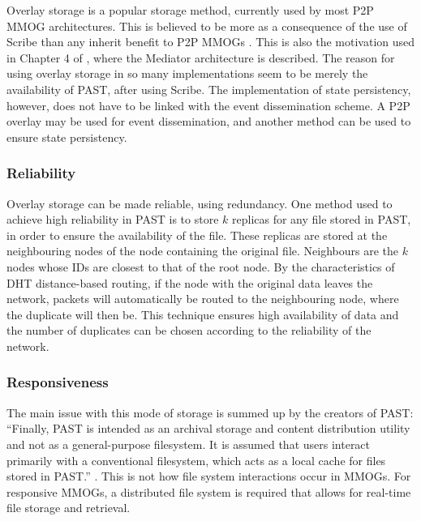 \documentclass[10pt,a4paper,journal,cspaper,compsoc]{IEEEtran}
\begin{document}

Overlay storage is a popular storage method, currently used by most P2P MMOG architectures. This is believed to be more as a consequence of the use
of Scribe than any inherit benefit to P2P MMOGs \cite{past_storage_focus}. This is also the motivation used in Chapter 4 of \cite{Fan_phd}, where the
Mediator architecture is described. The reason for using overlay storage in so many implementations seem to be merely the availability of PAST, after
using Scribe. The implementation of state persistency, however, does not have to be linked with the event dissemination scheme. A P2P overlay may be
used for event dissemination, and another method can be used to ensure state persistency.

\subsubsection{Reliability}
\label{overlay_storage_reliability}

Overlay storage can be made reliable, using redundancy. One method used to achieve high reliability in PAST is to store $k$ replicas for any file
stored in PAST, in order to ensure the availability of the file. These replicas are stored at the neighbouring nodes of the node containing the
original file. Neighbours are the $k$ nodes whose IDs are closest to that of the root node. By the characteristics of \ac{DHT} distance-based
routing, if the node with the original data leaves the network, packets will automatically be routed to the neighbouring node, where the duplicate
will then be. This technique ensures high availability of data and the number of duplicates can be chosen according to the reliability of the
network.


\subsubsection{Responsiveness}
The main issue with this mode of storage is summed up by the creators of PAST: ``Finally, PAST is intended as an archival storage and content
distribution utility and not as a general-purpose filesystem. It is assumed that users interact primarily with a conventional filesystem, which acts
as a local cache for files stored in PAST.'' \cite{storage_and_chaching_PAST}. This is not how file system interactions occur in MMOGs. For
responsive MMOGs, a distributed file system is required that allows for real-time file storage and retrieval.
\end{document}
